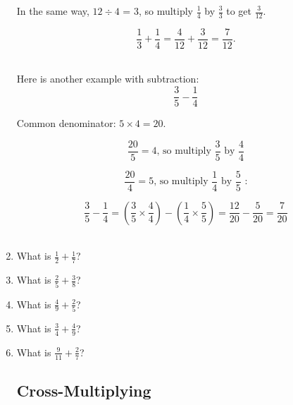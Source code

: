 \documentclass[14pt]{article}
\begin{document}
\begin{enumerate}
In the same way, $12 \div 4$ = 3, so multiply $\frac{1}{4}$ by $\frac{3}{3}$ to get $\frac{3}{12}$.

$$\frac{1}{3} + \frac{1}{4} = \frac{4}{12} + \frac{3}{12} = \frac{7}{12}.$$\\

\newpage

Here is another example with subtraction:
$$\frac{3}{5} - \frac{1}{4}$$

Common denominator: $5 \times 4 = 20$.

$$\frac{20}{5} = 4\text{, so multiply }\frac{3}{5} \text{ by }\frac{4}{4}$$

$$\frac{20}{4} = 5\text{, so multiply }\frac{1}{4}\text{ by }\frac{5}{5}\text{ :}$$

$$\frac{3}{5} - \frac{1}{4} = \left(\frac{3}{5} \times \frac{4}{4}\right) - \left(\frac{1}{4} \times \frac{5}{5}\right) = \frac{12}{20} - \frac{5}{20} = \frac{7}{20}$$\\

\item What is $\frac{1}{2}+\frac{1}{7}$?
\item What is $\frac{2}{5}+\frac{3}{8}$?
\item What is $\frac{4}{9}+\frac{2}{5}$?
\item What is $\frac{3}{4}+\frac{4}{9}$?
\item What is $\frac{9}{11}+\frac{2}{7}$?

\newpage

\subsection*{Cross-Multiplying}


\end{enumerate}
\end{document}
